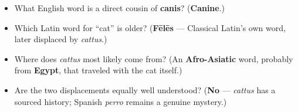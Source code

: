 \begin{tcolorbox}[breakable,colback=teal!4,colframe=teal!35!black,title={Before you move on}]
\begin{itemize}
\raggedright
  \item What English word is a direct cousin of \textbf{canis}? (\textbf{Canine}.)
  \item Which Latin word for \textquotedblleft{}cat\textquotedblright{} is older? (\textbf{Fēlēs} — Classical Latin's own word, later displaced by \emph{cattus}.)
  \item Where does \emph{cattus} most likely come from? (An \textbf{Afro-Asiatic} word, probably from \textbf{Egypt}, that traveled with the cat itself.)
  \item Are the two displacements equally well understood? (\textbf{No} — \emph{cattus} has a sourced history; Spanish \emph{perro} remains a genuine mystery.)
\end{itemize}
\end{tcolorbox}

